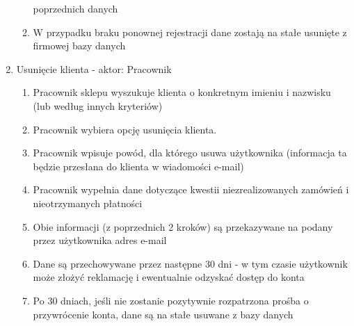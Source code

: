 \begin{enumerate}
\begin{enumerate}
    poprzednich danych
    \item W przypadku braku ponownej rejestracji dane zostają na stałe usunięte
    z firmowej bazy danych
  \end{enumerate}
  \item Usunięcie klienta - aktor: Pracownik
  \begin{enumerate}
    \item Pracownik sklepu wyszukuje klienta o konkretnym imieniu i nazwisku
    (lub według innych kryteriów)
    \item Pracownik wybiera opcję usunięcia klienta. 
    \item Pracownik wpisuje powód, dla którego usuwa użytkownika (informacja ta
    będzie przesłana do klienta w wiadomości e-mail)
    \item Pracownik wypełnia dane dotyczące kwestii niezrealizowanych zamówień i
    nieotrzymanych płatności
    \item Obie informacji (z poprzednich 2 kroków) są przekazywane na podany
    przez użytkownika adres e-mail
    \item Dane są przechowywane przez następne 30 dni - w tym czasie użytkownik
    może złożyć reklamację i ewentualnie odzyskać dostęp do konta
    \item Po 30 dniach, jeśli nie zostanie pozytywnie rozpatrzona prośba o
    przywrócenie konta, dane są na stałe usuwane z bazy danych
  \end{enumerate}
\end{enumerate}